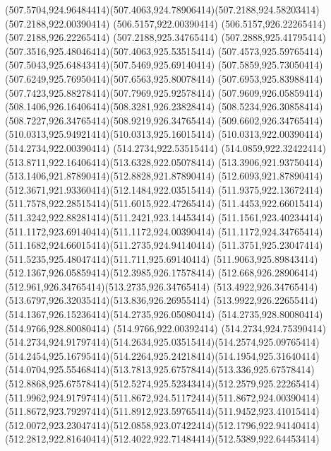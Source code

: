 {{	\curveto(507.5704,924.96484414)(507.4063,924.78906414)(507.2188,924.58203414)
	\lineto(507.2188,922.00390414)
	\lineto(506.5157,922.00390414)
	\lineto(506.5157,926.22265414)
	\lineto(507.2188,926.22265414)
	\lineto(507.2188,925.34765414)
	\curveto(507.2888,925.41795414)(507.3516,925.48046414)(507.4063,925.53515414)
	\curveto(507.4573,925.59765414)(507.5043,925.64843414)(507.5469,925.69140414)
	\curveto(507.5859,925.73050414)(507.6249,925.76950414)(507.6563,925.80078414)
	\curveto(507.6953,925.83988414)(507.7423,925.88278414)(507.7969,925.92578414)
	\curveto(507.9609,926.05859414)(508.1406,926.16406414)(508.3281,926.23828414)
	\curveto(508.5234,926.30858414)(508.7227,926.34765414)(508.9219,926.34765414)
	\curveto(509.6602,926.34765414)(510.0313,925.94921414)(510.0313,925.16015414)
	\lineto(510.0313,922.00390414)
	\closepath
	\moveto(514.2734,922.00390414)
	\lineto(514.2734,922.53515414)
	\curveto(514.0859,922.32422414)(513.8711,922.16406414)(513.6328,922.05078414)
	\curveto(513.3906,921.93750414)(513.1406,921.87890414)(512.8828,921.87890414)
	\curveto(512.6093,921.87890414)(512.3671,921.93360414)(512.1484,922.03515414)
	\curveto(511.9375,922.13672414)(511.7578,922.28515414)(511.6015,922.47265414)
	\curveto(511.4453,922.66015414)(511.3242,922.88281414)(511.2421,923.14453414)
	\curveto(511.1561,923.40234414)(511.1172,923.69140414)(511.1172,924.00390414)
	\curveto(511.1172,924.34765414)(511.1682,924.66015414)(511.2735,924.94140414)
	\curveto(511.3751,925.23047414)(511.5235,925.48047414)(511.711,925.69140414)
	\curveto(511.9063,925.89843414)(512.1367,926.05859414)(512.3985,926.17578414)
	\curveto(512.668,926.28906414)(512.961,926.34765414)(513.2735,926.34765414)
	\curveto(513.4922,926.34765414)(513.6797,926.32035414)(513.836,926.26955414)
	\curveto(513.9922,926.22655414)(514.1367,926.15236414)(514.2735,926.05080414)
	\lineto(514.2735,928.80080414)
	\lineto(514.9766,928.80080414)
	\lineto(514.9766,922.00392414)
	\closepath
	\moveto(514.2734,924.75390414)
	\curveto(514.2734,924.91797414)(514.2634,925.03515414)(514.2574,925.09765414)
	\curveto(514.2454,925.16795414)(514.2264,925.24218414)(514.1954,925.31640414)
	\curveto(514.0704,925.55468414)(513.7813,925.67578414)(513.336,925.67578414)
	\curveto(512.8868,925.67578414)(512.5274,925.52343414)(512.2579,925.22265414)
	\curveto(511.9962,924.91797414)(511.8672,924.51172414)(511.8672,924.00390414)
	\curveto(511.8672,923.79297414)(511.8912,923.59765414)(511.9452,923.41015414)
	\curveto(512.0072,923.23047414)(512.0858,923.07422414)(512.1796,922.94140414)
	\curveto(512.2812,922.81640414)(512.4022,922.71484414)(512.5389,922.64453414)
}}
